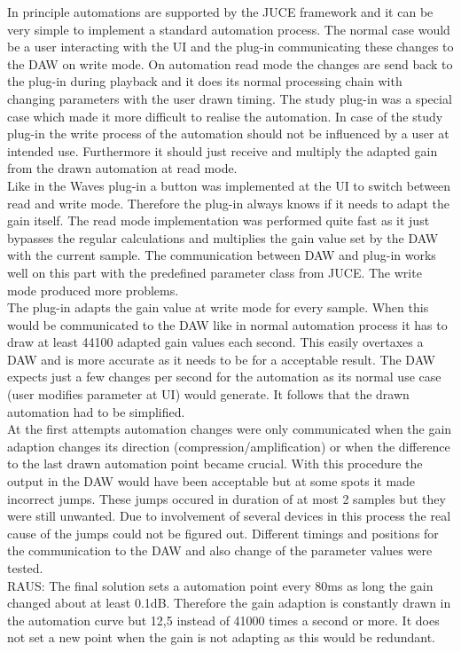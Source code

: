 In principle automations are supported by the JUCE framework and it can be very simple to implement a standard automation process. The normal case would be a user interacting with the UI and the plug-in communicating these changes to the DAW on write mode. On automation read mode the changes are send back to the plug-in during playback and it does its normal processing chain with changing parameters with the user drawn timing. The study plug-in was a special case which made it more difficult to realise the automation. In case of the study plug-in the write process of the automation should not be influenced by a user at intended use. Furthermore it should just receive and multiply the adapted gain from the drawn automation at read mode.\\
Like in the Waves plug-in a button was implemented at the UI to switch between read and write mode. Therefore the plug-in always knows if it needs to adapt the gain itself. The read mode implementation was performed quite fast as it just bypasses the regular calculations and multiplies the gain value set by the DAW with the current sample. The communication between DAW and plug-in works well on this part with the predefined parameter class from JUCE. The write mode produced more problems.\\
The plug-in adapts the gain value at write mode for every sample. When this would be communicated to the DAW like in normal automation process it has to draw at least 44100 adapted gain values each second. This easily overtaxes a DAW and is more accurate as it needs to be for a acceptable result. The DAW expects just a few changes per second for the automation as its normal use case (user modifies parameter at UI) would generate. It follows that the drawn automation had to be simplified.\\
At the first attempts automation changes were only communicated when the gain adaption changes its direction (compression/amplification) or when the difference to the last drawn automation point became crucial. With this procedure the output in the DAW would have been acceptable but at some spots it made incorrect jumps. These jumps occured in duration of at most 2 samples but they were still unwanted. Due to involvement of several devices in this process the real cause of the jumps could not be figured out. Different timings and positions for the communication to the DAW and also change of the parameter values were tested.\\

RAUS:
The final solution sets a automation point every 80ms as long the gain changed about at least 0.1dB.
Therefore the gain adaption is constantly drawn in the automation curve but 12,5 instead of 41000 times a second or more. It does not set a new point when the gain is not adapting as this would be redundant. 

